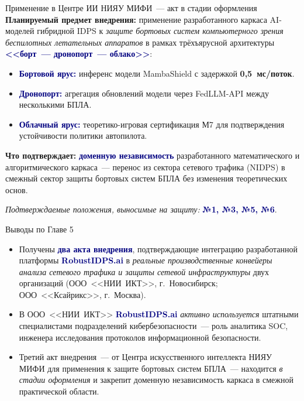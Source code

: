 \documentclass[10pt,aspectratio=169]{beamer}
\newcommand{\hl}[1]{\textcolor{accent}{\textbf{#1}}}
\newcommand{\bn}[1]{\textcolor{navy}{\textbf{#1}}}
\begin{document}
\begin{frame}{Применение в Центре ИИ НИЯУ МИФИ~--- акт в стадии оформления}
\small
\textbf{Планируемый предмет внедрения:} применение
разработанного каркаса AI-моделей гибридной IDPS к
\emph{защите бортовых систем компьютерного зрения
беспилотных летательных аппаратов} в рамках трёхъярусной
архитектуры
\bn{<<борт~--- дронопорт~--- облако>>}:
\begin{itemize}\setlength\itemsep{0pt}
\item \bn{Бортовой ярус:} инференс модели MambaShield с
задержкой \hl{0{,}5~мс/поток}.
\item \bn{Дронопорт:} агрегация обновлений модели через
FedLLM-API между несколькими БПЛА.
\item \bn{Облачный ярус:} теоретико-игровая сертификация М7
для подтверждения устойчивости политики автопилота.
\end{itemize}
\smallskip

\textbf{Что подтверждает:} \bn{доменную независимость}
разработанного математического и алгоритмического каркаса~---
перенос из сектора сетевого трафика (NIDPS) в смежный сектор
защиты бортовых систем БПЛА без изменения теоретических основ.
\smallskip

\begin{block}{}
\footnotesize \emph{Подтверждаемые положения, выносимые на
защиту:} \bn{№1, №3, №5, №6}.
\end{block}
\end{frame}

\begin{frame}{Выводы по Главе 5}
\small
\begin{itemize}\setlength\itemsep{4pt}
\item Получены \bn{два акта внедрения}, подтверждающие
интеграцию разработанной платформы \bn{RobustIDPS.ai} в
\emph{реальные производственные конвейеры анализа сетевого
трафика и защиты сетевой инфраструктуры} двух организаций
(ООО~<<НИИ~ИКТ>>, г.~Новосибирск; ООО~<<Ксайрикс>>,
г.~Москва).
\item В ООО~<<НИИ~ИКТ>> \bn{RobustIDPS.ai} \emph{активно
используется} штатными специалистами подразделений
кибербезопасности~--- роль аналитика SOC, инженера
исследования протоколов информационной безопасности.
\item Третий акт внедрения~--- от Центра искусственного
интеллекта НИЯУ МИФИ для применения к защите бортовых систем
БПЛА~--- находится \emph{в стадии оформления} и закрепит
доменную независимость каркаса в смежной практической
области.
\end{itemize}
\end{frame}
\end{document}
